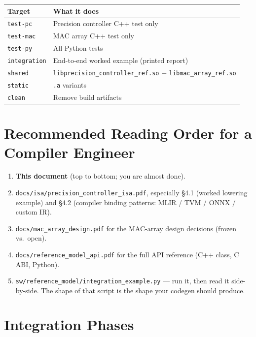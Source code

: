 \documentclass[11pt]{article}
\begin{document}
\begin{table}[ht]
\centering
\small
\begin{tabular}{@{}l l@{}}
\toprule
Target          & What it does \\
\midrule
\texttt{test-pc}     & Precision controller C++ test only \\
\texttt{test-mac}    & MAC array C++ test only \\
\texttt{test-py}     & All Python tests \\
\texttt{integration} & End-to-end worked example (printed report) \\
\texttt{shared}      & \texttt{libprecision\_controller\_ref.so} + \texttt{libmac\_array\_ref.so} \\
\texttt{static}      & \texttt{.a} variants \\
\texttt{clean}       & Remove build artifacts \\
\bottomrule
\end{tabular}
\end{table}

\section{Recommended Reading Order for a Compiler Engineer}
\label{sec:reading}

\begin{enumerate}
\item \textbf{This document} (top to bottom; you are almost done).
\item \texttt{docs/isa/precision\_controller\_isa.pdf}, especially
      \S4.1 (worked lowering example) and \S4.2 (compiler binding
      patterns: MLIR / TVM / ONNX / custom IR).
\item \texttt{docs/mac\_array\_design.pdf} for the MAC-array design
      decisions (frozen vs.\ open).
\item \texttt{docs/reference\_model\_api.pdf} for the full API
      reference (C++ class, C ABI, Python).
\item \texttt{sw/reference\_model/integration\_example.py} ---
      run it, then read it side-by-side. The shape of that script
      is the shape your codegen should produce.
\end{enumerate}

\section{Integration Phases}
\label{sec:phases}
\end{document}
